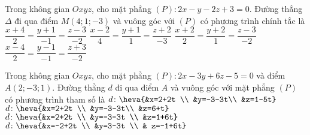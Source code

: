 \begin{ex}%
	Trong không gian $Oxyz$, cho mặt phẳng $(P)\colon 2x - y - 2z + 3 = 0$. Đường thẳng $\Delta$ đi qua điểm $M(4; 1; -3)$ và vuông góc với $(P)$ có phương trình chính tắc là
	\choice
	{$\dfrac{x+4}{2} = \dfrac{y+1}{-1} = \dfrac{z-3}{-2}$}
	{$\dfrac{x-2}{4} = \dfrac{y+1}{1} = \dfrac{z+2}{-3}$}
	{$\dfrac{x+2}{2} = \dfrac{y+2}{1} = \dfrac{z-3}{-2}$}
	{\True $\dfrac{x-4}{2} = \dfrac{y-1}{-1} = \dfrac{z+3}{-2}$}
\end{ex}

%

\begin{ex}%
	Trong không gian $Oxyz$, cho mặt phẳng $(P)\colon 2x-3y+6z-5=0$ và điểm $A(2;-3; 1)$. Đường thẳng $d$ đi qua điểm $A$ và vuông góc với mặt phẳng $(P)$ có phương trình tham số là
	\choice
	{$d \colon\heva{&x=2+2t \\ &y=-3-3t\\ &z=1-5t}$}
	{$d \colon\heva{&x=2+2t \\ &y=-3-3t\\ &z=6+t}$}
	{\True $d \colon\heva{&x=2+2t \\ &y=-3-3t \\  &z=1+6t}$}
	{$d \colon\heva{&x=-2+2t \\ &y=3-3t \\ & z=-1+6t}$}
\end{ex}

